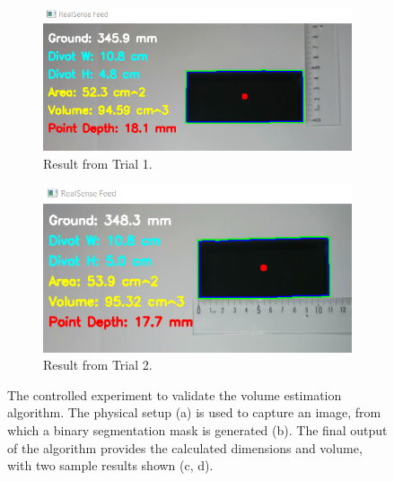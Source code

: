 \begin{figure}[h!]
    \vspace{0.5cm} %

    \begin{subfigure}[b]{0.49\textwidth}
        \centering
        \includegraphics[width=\linewidth]{figures/volume_test_result_5_fix.png}
        \caption{Result from Trial 1.}
        \label{fig:volume_test_result_1}
    \end{subfigure}
    \hfill
    \begin{subfigure}[b]{0.49\textwidth}
        \centering
        \includegraphics[width=\linewidth]{figures/volume_test_result_11_fix.png}
        \caption{Result from Trial 2.}
        \label{fig:volume_test_result_2}
    \end{subfigure}
    
    \caption[Controlled Experiment for Volume Estimation.] %
    {The controlled experiment to validate the volume estimation algorithm. The physical setup (a) is used to capture an image, from which a binary segmentation mask is generated (b). The final output of the algorithm provides the calculated dimensions and volume, with two sample results shown (c, d).}
    \label{fig:volume_test_setup}
\end{figure}

